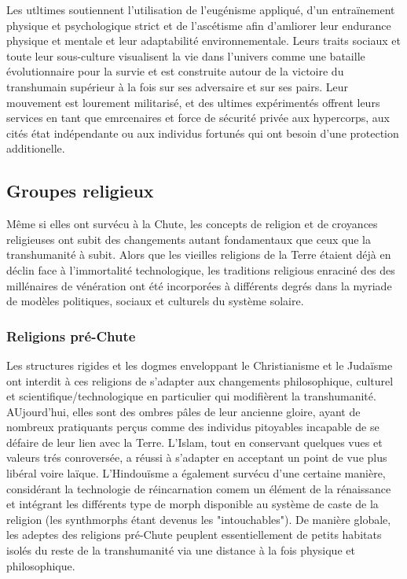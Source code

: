 Les utltimes soutiennent l'utilisation de l'eugénisme appliqué, d'un entraïnement physique et psychologique strict et de l'ascétisme afin d'amliorer leur endurance physique et mentale et leur adaptabilité environnementale. Leurs traits sociaux et toute leur sous-culture visualisent la vie dans l'univers comme une bataille évolutionnaire pour la survie et est construite autour de la victoire du transhumain supérieur à la fois sur ses adversaire et sur ses pairs. Leur mouvement est lourement militarisé, et des ultimes expérimentés offrent leurs services en tant que emrcenaires et force de sécurité privée aux hypercorps, aux cités état indépendante ou aux individus fortunés qui ont besoin d'une protection additionelle. 

\subsection{Groupes religieux} \label{sec:religious-groups} 

Même si elles ont survécu à la Chute, les concepts de religion et de croyances religieuses ont subit des changements autant fondamentaux que ceux que la transhumanité à subit. Alors que les vieilles religions de la Terre étaient déjà en déclin face à l'immortalité technologique, les traditions religious enraciné des des millénaires de vénération ont été incorporées à différents degrés dans la myriade de modèles politiques, sociaux et culturels du système solaire. 

\subsubsection{Religions pré-Chute} \label{sec:pre-fall-religions} 

Les structures rigides et les dogmes enveloppant le Christianisme et le Judaïsme ont interdit à ces religions de s'adapter aux changements philosophique, culturel et scientifique/technologique en particulier qui modifièrent la transhumanité. AUjourd'hui, elles sont des ombres pâles de leur ancienne gloire, ayant de nombreux pratiquants perçus comme des individus pitoyables incapable de se défaire de leur lien avec la Terre. L'Islam, tout en conservant quelques vues et valeurs trés conroversée, a réussi à s'adapter en acceptant un point de vue plus libéral voire laïque. L'Hindouïsme a également survécu d'une certaine manière, considérant la technologie de réincarnation comem un élément de la rénaissance et intégrant les différents type de morph disponible au système de caste de la religion (les synthmorphs étant devenus les "intouchables"). De manière globale, les adeptes des religions pré-Chute peuplent essentiellement de petits habitats isolés du reste de la transhumanité via une distance à la fois physique et philosophique. 

